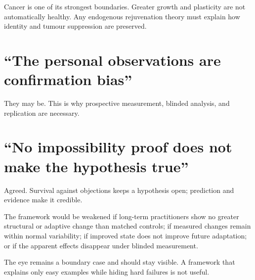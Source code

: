 Cancer is one of its strongest boundaries. Greater growth and plasticity are not automatically healthy. Any endogenous rejuvenation theory must explain how identity and tumour suppression are preserved.

\section{``The personal observations are confirmation bias''}\label{the-personal-observations-are-confirmation-bias}

They may be. This is why prospective measurement, blinded analysis, and replication are necessary.

\section{``No impossibility proof does not make the hypothesis true''}\label{no-impossibility-proof-does-not-make-the-hypothesis-true}

Agreed. Survival against objections keeps a hypothesis open; prediction and evidence make it credible.

The framework would be weakened if long-term practitioners show no greater structural or adaptive change than matched controls; if measured changes remain within normal variability; if improved state does not improve future adaptation; or if the apparent effects disappear under blinded measurement.

The eye remains a boundary case and should stay visible. A framework that explains only easy examples while hiding hard failures is not useful.
